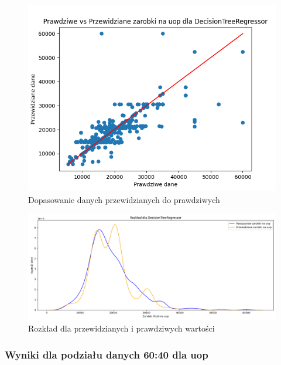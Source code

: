 \documentclass[a4paper]{article}
\begin{document}
\begin{figure}[H]
    \centering
    \includegraphics[width=\textwidth]{../analysis/plots/wyniki/0.6&0.4/uop/DecisionTreeRegressor/scatter.png}
    \caption{Dopasowanie danych przewidzianych do prawdziwych}
\end{figure}

\begin{figure}[H]
    \centering
    \includegraphics[width=\textwidth]{../analysis/plots/wyniki/0.6&0.4/uop/DecisionTreeRegressor/salary_dist.png}
    \caption{Rozkład dla przewidzianych i prawdziwych wartości}
\end{figure}

\subsubsection{Wyniki dla podziału danych 60:40 dla uop}
\end{document}
